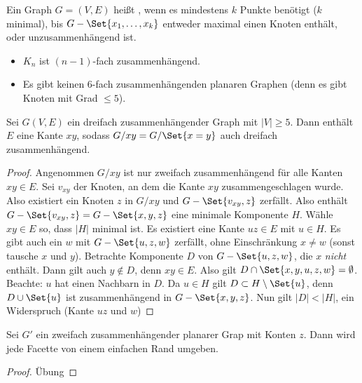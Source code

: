 \begin{df}
    Ein Graph $G = (V, E)$ heißt , wenn es mindestens $k$ Punkte benötigt ($k$ minimal), bis $G - \Set{x_1, \dotsc, x_k}$ entweder maximal einen Knoten enthält, oder unzusammenhängend ist.
\end{df}


\begin{nt}
    \begin{itemize}
        \item
            $K_n$ ist $(n-1)$-fach zusammenhängend.
        \item
            Es gibt keinen $6$-fach zusammenhängenden planaren Graphen (denn es gibt Knoten mit Grad $\le 5$).
    \end{itemize}
\end{nt}

\begin{st}[Thomassen, 1980]
    Sei $G(V, E)$ ein dreifach zusammenhängender Graph mit $|V| \ge 5$.
    Dann enthält $E$ eine Kante $xy$, sodass $G / xy = G / \Set{x=y}$ auch dreifach zusammenhängend.
    \begin{proof}
        Angenommen $G / xy$ ist nur zweifach zusammenhängend für alle Kanten $xy \in E$.
        Sei $v_{xy}$ der Knoten, an dem die Kante $xy$ zusammengeschlagen wurde.
        Also existiert ein Knoten $z$ in $G / xy$ und $G - \Set{v_{xy}, z}$ zerfällt.
        Also enthält $G - \Set{v_{xy}, z} = G - \Set{x,y,z}$ eine minimale Komponente $H$.
        Wähle $xy \in E$ so, dass $|H|$ minimal ist.
        Es existiert eine Kante $uz \in E$ mit $u \in H$.
        Es gibt auch ein $w$ mit $G - \Set{u,z,w}$ zerfällt, ohne Einschränkung $x \neq w$ (sonst tausche $x$ und $y$).
        Betrachte Komponente $D$ von $G - \Set{u,z,w}$, die $x$ \emph{nicht} enthält.
        Dann gilt auch $y \not\in D$, denn $xy \in E$.
        Also gilt $D \cap \Set{x,y,u,z,w} = \emptyset$.
        Beachte: $u$ hat einen Nachbarn in $D$.
        Da $u \in H$ gilt $D \subset H \setminus \Set{u}$, denn $D \cup \Set{u}$ ist zusammenhängend in $G - \Set{x,y,z}$.
        Nun gilt $|D| < |H|$, ein Widerspruch (Kante $uz$ und $w$)
    \end{proof}
\end{st}

\begin{lem}
    Sei $G'$ ein zweifach zusammenhängender planarer Grap mit Konten $z$.
    Dann wird jede Facette von einem einfachen Rand umgeben.
    \begin{proof}
        Übung
    \end{proof}
\end{lem}
